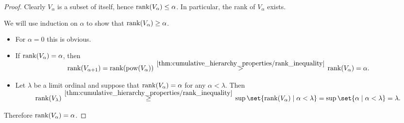 \begin{proof}
   Clearly \( V_\alpha \) is a subset of itself, hence \( \operatorname{rank}(V_\alpha) \leq \alpha \). In particular, the rank of \( V_\alpha \) exists.

  We will use induction on \( \alpha \) to show that \( \operatorname{rank}(V_\alpha) \geq \alpha \).
  \begin{itemize}
    \item For \( \alpha = 0 \) this is obvious.
    \item If \( \operatorname{rank}(V_\alpha) = \alpha \), then
    \begin{equation*}
      \rank(V_{\alpha + 1})
      =
      \rank(\pow(V_\alpha))
      \reloset {\ref{thm:cumulative_hierarchy_properties/rank_inequality}} >
      \rank(V_\alpha)
      =
      \alpha.
    \end{equation*}

    \item Let \( \lambda \) be a limit ordinal and suppose that \( \operatorname{rank}(V_\alpha) = \alpha \) for any \( \alpha < \lambda \). Then
    \begin{equation*}
      \rank(V_\lambda)
      \reloset {\ref{thm:cumulative_hierarchy_properties/rank_inequality}} \geq
      \sup\set{ \rank(V_\alpha) \given \alpha < \lambda }
      =
      \sup\set{ \alpha \given \alpha < \lambda }
      =
      \lambda.
    \end{equation*}
  \end{itemize}

  Therefore \( \operatorname{rank}(V_\alpha) = \alpha \).
\end{proof}

